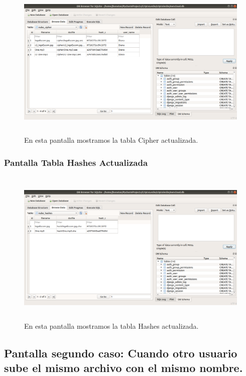 			\begin{figure}[H]
			\centering
			\includegraphics[width=14cm, height=7.5cm]{./images/Implementacion/TablaCipherOtroArchivoNuevo.png}
			\caption{En esta pantalla mostramos la tabla Cipher actualizada.}
			\label{fig:6-1-17} 
			\end{figure}

\subsubsection{Pantalla Tabla Hashes Actualizada }

			\begin{figure}[H]
			\centering
			\includegraphics[width=14cm, height=7.5cm]{./images/Implementacion/TablaHashesOtroArchivoNuevo.png}
			\caption{En esta pantalla mostramos la tabla Hashes actualizada.}
			\label{fig:6-1-18} 
			\end{figure}

\subsection{Pantalla segundo caso: Cuando otro usuario sube el mismo archivo con el mismo nombre.}

